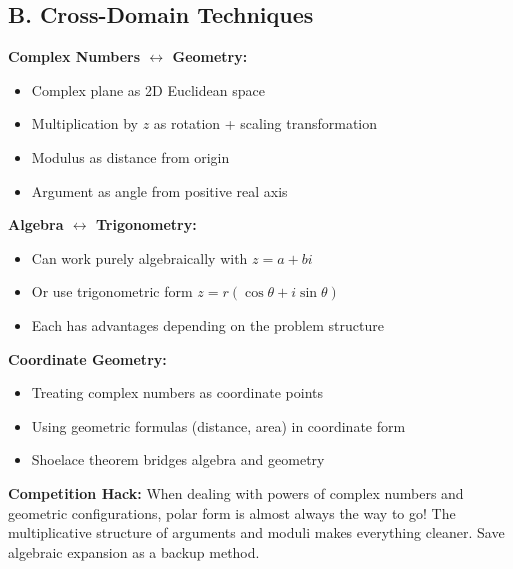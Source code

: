 \documentclass[12pt]{article}
\begin{document}
\begin{tacticalbox}
\subsection*{B. Cross-Domain Techniques}

\textbf{Complex Numbers $\leftrightarrow$ Geometry:}
\begin{itemize}
    \item Complex plane as 2D Euclidean space
    \item Multiplication by $z$ as rotation + scaling transformation
    \item Modulus as distance from origin
    \item Argument as angle from positive real axis
\end{itemize}

\textbf{Algebra $\leftrightarrow$ Trigonometry:}
\begin{itemize}
    \item Can work purely algebraically with $z = a + bi$
    \item Or use trigonometric form $z = r(\cos\theta + i\sin\theta)$
    \item Each has advantages depending on the problem structure
\end{itemize}

\textbf{Coordinate Geometry:}
\begin{itemize}
    \item Treating complex numbers as coordinate points
    \item Using geometric formulas (distance, area) in coordinate form
    \item Shoelace theorem bridges algebra and geometry
\end{itemize}
\end{tacticalbox}

\vspace{1em}

\begin{protipbox}
\textbf{Competition Hack:} When dealing with powers of complex numbers and geometric configurations, polar form is almost always the way to go! The multiplicative structure of arguments and moduli makes everything cleaner. Save algebraic expansion as a backup method.
\end{protipbox}

\vspace{1em}
\end{document}
